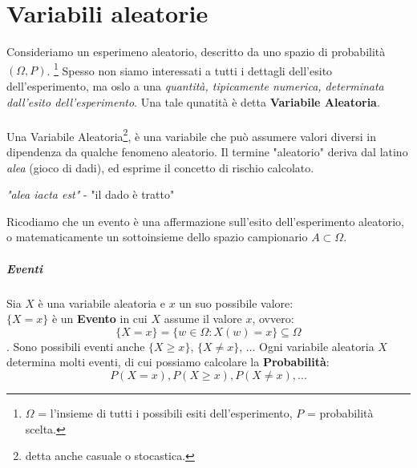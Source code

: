 \chapter{Variabili aleatorie}
Consideriamo un esperimeno aleatorio, descritto da uno spazio di probabilità $(\Omega, P)$.
\footnote{$\Omega$ = l'insieme di tutti i possibili esiti dell'esperimento, $P$ = probabilità scelta.}
Spesso non siamo interessati a tutti i dettagli dell'esito dell'esperimento, ma oslo a una \emph{quantità, tipicamente numerica, determinata dall'esito dell'esperimento}.
Una tale qunatità è detta \textbf{Variabile Aleatoria}.
\\\\Una Variabile Aleatoria\footnote{detta anche casuale o stocastica.}, è una variabile che può assumere valori diversi in dipendenza da qualche fenomeno aleatorio.
Il termine "aleatorio" deriva dal latino \textit{alea} (gioco di dadi), ed esprime il
concetto di rischio calcolato.
\begin{center}
	\textit{"alea iacta est"} - "il dado è tratto"
\end{center}

Ricodiamo che un evento è una affermazione sull'esito dell'esperimento aleatorio, o matematicamente un
sottoinsieme dello spazio campionario $A \subset \Omega$.

\paragraph{Eventi} Sia $X$ è una variabile aleatoria e $x$ un suo possibile valore:
\\$\{X = x\}$ è un \textbf{Evento} in cui $X$ assume il valore $x$, ovvero:
	\[\{X = x\}= \{w \in \Omega: X(w) = x\} \subseteq \Omega\].
	Sono possibili eventi anche $\{X \geq x\}$, $\{X \neq x\}$, ...
	Ogni variabile aleatoria $X$ determina molti eventi, di cui possiamo calcolare la \textbf{Probabilità}:
	\[P(X=x), P(X\geq x), P(X\neq x), ...\]

